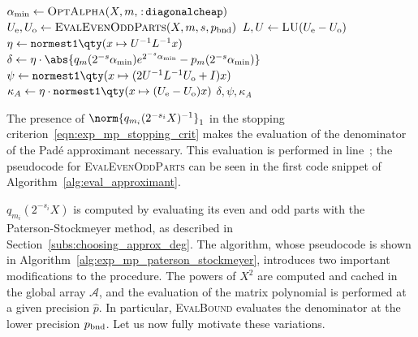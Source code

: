 \begin{algorithm}[hbp]
	\caption{\emph{Padé version of the function \emph{\textsc{EvalBound}}; that evaluates the bound~\eqref{eqn:abserr_bound_delta} with the parameters $s_i,m_i$ of the current iteration of the modified scaling phase, and updates many variables and auxiliary data structures.}}
	\label{alg:eval_bound_pade}
	\begin{algorithmic}[1]
			\State $\alpha_{\min}\gets\textsc{OptAlpha}(X,m,\mathtt{\colon\!diagonalcheap})$\label{line:alpha_min_computation}
			\State $U_{\textup{e}}, U_{\textup{o}} \gets \textsc{EvalEvenOddParts}(X, m, s, p_{\textup{bnd}})	$\label{line:eval_pade_ps}
				\State $L, U\gets \textsc{LU}(U_{\textup{e}}-U_{\textup{o}})$\label{line:LU_fact_q}
				\State $\eta\gets\texttt{normest1}\qty(x\mapsto U^{-1}L^{-1}x)$\label{line:eta_normest1}
			\EndWith
			\State $\delta\gets\eta\cdot\abs{q_m(2^{-s}\alpha_{\min})e^{2^{-s}\alpha_{\min}}-p_m(2^{-s}\alpha_{\min})}$\label{line:delta_computation}
			\State $\psi\gets\texttt{normest1}\qty(x\mapsto (2U^{-1}L^{-1}U_{\textup{o}}+I)x)$\label{line:psi_computation}
			\State $\kappa_A\gets\eta\cdot\texttt{normest1}\qty(x\mapsto(U_{\textup{e}}-U_{\textup{o}})x)$\label{line:kappa_computation}
			\State\Return $\delta,\psi,\kappa_A$
		\EndFunction
	\end{algorithmic}
\end{algorithm}

The presence of $\norm{q_{m_i}(2^{-{s_i}}X)^{-1}}_1$ in the stopping criterion~\eqref{eqn:exp_mp_stopping_crit} makes the evaluation of the denominator of the Padé approximant necessary. This evaluation is performed in line~; the pseudocode for \textsc{EvalEvenOddParts} can be seen in the first code snippet of Algorithm~\ref{alg:eval_approximant}. 

$q_{m_i}(2^{-s_i}X)$ is computed by evaluating its even and odd parts with the Paterson-Stockmeyer method, as described in Section~\ref{subs:choosing_approx_deg}. 
The algorithm, whose pseudocode is shown in Algorithm~\ref{alg:exp_mp_paterson_stockmeyer}, introduces two important modifications to the procedure. The powers of $X^2$ are computed and cached in the global array $\mathcal{A}$, and the evaluation of the matrix polynomial is performed at a given precision $\hat{p}$. In particular, \textsc{EvalBound} evaluates the denominator at the lower precision $p_{\textup{bnd}}$.
Let us now fully motivate these variations.

